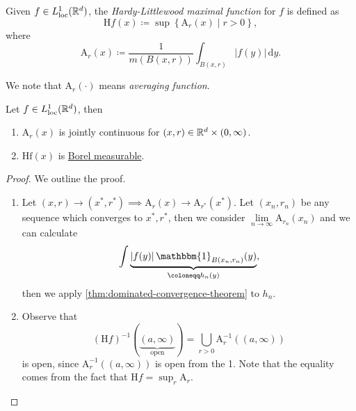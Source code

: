 \begin{definition}\label{def:HL-maximal-function}
  Given \(f\in L^1_{\text{loc} }(\mathbb{\MakeUppercase{r}} ^d)\), the \emph{Hardy-Littlewood maximal function} for \(f\) is defined as
  \[
    \mathrm{H}f(x) \coloneqq \sup \left\{\mathrm{A}_r(x)\mid r > 0\right\},
  \]
  where
  \[
    \mathrm{A}_r(x) \coloneqq \frac{1}{m(B(x, r))}\int _{B(x, r)} \left\vert f(y) \right\vert \,\mathrm{d}y.
  \]
\end{definition}
\begin{note}
  We note that \(\mathrm{A}_r(\cdot) \) means \emph{averaging function}.
\end{note}
\begin{lemma}\label{lma:lec21}
  Let \(f\in L^1_{\text{loc} }(\mathbb{\MakeUppercase{r}} ^d)\), then
  \begin{enumerate}
    \item \(\mathrm{A}_r(x)\) is jointly continuous for \((x, r)\in \mathbb{\MakeUppercase{r}} ^d \times (0, \infty )\).
    \item \(\mathrm{Hf}(x) \) is \hyperref[def:Borel-measurable]{Borel measurable}.
  \end{enumerate}
\end{lemma}
\begin{proof}
  We outline the proof.
  \begin{enumerate}
    \item Let \((x, r)\to (x^\ast, r^\ast)\implies \mathrm{A}_r(x)\to \mathrm{A}_{r^\ast}(x^\ast)\). Let \((x_{n} , r_{n} )\) be any sequence which converges to
          \(x^\ast, r^\ast\), then we consider \(\lim\limits_{n \to \infty} \mathrm{A}_{r_{n} }(x_{n} )\) and we can calculate
          \[
            \int\underbrace{\left\vert f(y) \right\vert \mathbbm{1}_{B(x_{n} , r_{n} )} (y)}_{\coloneqq h_{n} (y)},
          \]
          then we apply \autoref{thm:dominated-convergence-theorem} to \(h_{n} \).
    \item Observe that
          \[
            (\mathrm{H}f)^{-1} (\underbrace{(a, \infty )}_{\text{open} }) = \bigcup\limits_{r>0} \mathrm{A}_{r} ^{-1} \left((a, \infty )\right)
          \]
          is open, since \(\mathrm{A} _{r} ^{-1} \left((a, \infty )\right)\) is open from the 1. Note that the equality comes from the fact that \(\mathrm{H}f = \sup_{r} \mathrm{A} _{r} \).
  \end{enumerate}
\end{proof}

